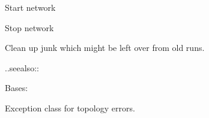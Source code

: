\documentclass[letterpaper,10pt,english]{sphinxmanual}
\begin{document}
\begin{fulllineitems}
\begin{fulllineitems}
\label{infr/topology:escape.infr.topology.ESCAPENetworkBridge.start_network}
Start network

\end{fulllineitems}


\begin{fulllineitems}
\label{infr/topology:escape.infr.topology.ESCAPENetworkBridge.stop_network}
Stop network

\end{fulllineitems}


\begin{fulllineitems}
\label{infr/topology:escape.infr.topology.ESCAPENetworkBridge.cleanup}
Clean up junk which might be left over from old runs.
\begin{description}
\item[{..seealso::}] \leavevmode
{}

\end{description}

\end{fulllineitems}


\end{fulllineitems}


\begin{fulllineitems}
\label{infr/topology:escape.infr.topology.TopologyBuilderException}
Bases: \href{https://docs.python.org/2.7/library/exceptions.html\#exceptions.Exception}{}

Exception class for topology errors.

\end{fulllineitems}

\end{document}
